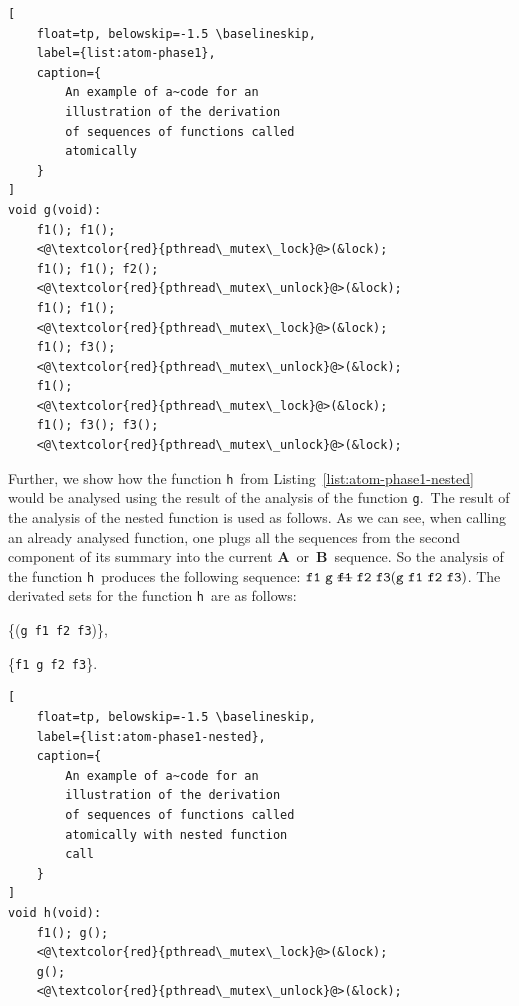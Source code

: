 \documentclass{ExcelAtFIT}
\begin{document}
\begin{lstlisting}[
    float=tp, belowskip=-1.5 \baselineskip,
    label={list:atom-phase1},
    caption={
        An example of a~code for an
        illustration of the derivation
        of sequences of functions called
        atomically
    }
]
void g(void):
    f1(); f1();
    <@\textcolor{red}{pthread\_mutex\_lock}@>(&lock);
    f1(); f1(); f2();
    <@\textcolor{red}{pthread\_mutex\_unlock}@>(&lock);
    f1(); f1();
    <@\textcolor{red}{pthread\_mutex\_lock}@>(&lock);
    f1(); f3();
    <@\textcolor{red}{pthread\_mutex\_unlock}@>(&lock);
    f1();
    <@\textcolor{red}{pthread\_mutex\_lock}@>(&lock);
    f1(); f3(); f3();
    <@\textcolor{red}{pthread\_mutex\_unlock}@>(&lock);
\end{lstlisting}

Further, we show how the function
\texttt{h}~from Listing~\ref{list:atom-phase1-nested}
would be analysed using the result of the analysis of
the function \texttt{g}.~The result of the analysis
of the nested function is used as follows. As we can
see, when calling an already analysed function, one
plugs all the sequences from the second component
of its summary into the current
\textbf{A}~or~\textbf{B}~sequence.
So the analysis of the function 
\texttt{h}~produces the following sequence:
$
    \text{\texttt{f1} \texttt{g} \sout{\texttt{f1}} \texttt{f2} \texttt{f3}}
    (\text{\texttt{g} \texttt{f1} \texttt{f2} \texttt{f3}})
$.
The derivated sets for the
function \texttt{h}~are as follows:
\begin{enumerate*}[label={(\roman*)}, topsep=0.4em]
    \item
        \{(\texttt{g}~\texttt{f1}~\texttt{f2}~\texttt{f3})\},

    \item
        \{\texttt{f1}~\texttt{g}~\texttt{f2}~\texttt{f3}\}.
\end{enumerate*}

\begin{lstlisting}[
    float=tp, belowskip=-1.5 \baselineskip,
    label={list:atom-phase1-nested},
    caption={
        An example of a~code for an
        illustration of the derivation
        of sequences of functions called
        atomically with nested function
        call
    }
]
void h(void):
    f1(); g();
    <@\textcolor{red}{pthread\_mutex\_lock}@>(&lock);
    g();
    <@\textcolor{red}{pthread\_mutex\_unlock}@>(&lock);
\end{lstlisting}
\end{document}
